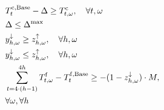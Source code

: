 {\begin{subequations}
\begin{align}
        \quad                                                                                             & \quad T^{\rm{c},\text{Base}}_{t} - \Delta \geq T^{\rm{c}}_{t, \omega}, \quad                                                                                                                                                                                                                                                                    \forall{t, \omega} \label{temp:3} \\
        \quad                                                                                             & \quad \Delta \leq \Delta^{\text{max}} \label{temp:4}                                                                                                                                                                                                                                                                                                                              \\
        \quad                                                                                             & \quad y^{\downarrow}_{h, \omega} \geq z^{\uparrow}_{h, \omega}, \quad                                                                                                                                                                                                                                                                 \forall{h, \omega} \label{rebound:1}        \\
        \quad                                                                                             & \quad y^{\downarrow}_{h, \omega} \leq z^{\uparrow}_{h, \omega}, \quad                                                                                                                                                                                                                                                                 \forall{h, \omega} \label{rebound:2}        \\
        \quad                                                                                             & \quad \sum_{t=4\cdot(h-1)}^{4 h} T^{\rm{f}}_{t, \omega} - T^{\rm{f}, \text{Base}}_{t} \geq - (1 - z^{\downarrow}_{h, \omega}) \cdot M, \notag                                                                                                                                                                                                                                     \\ \quad & \quad  \forall{\omega}, \forall{h} \label{rebound:3}                                                                                                                                                                                 \\

\end{align}
\end{subequations}}
